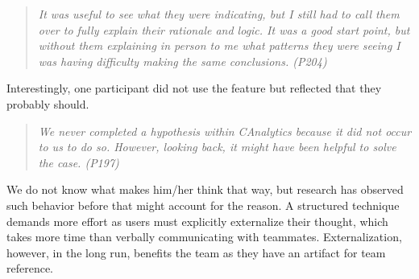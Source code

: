\begin{quote}
\emph{It was useful to see what they were indicating, but I still had to call them over to fully explain their rationale and logic. It was a good start point, but without them explaining in person to me what patterns they were seeing I was having difficulty making the same conclusions. (P204)}

\end{quote}

Interestingly, one participant did not use the feature but reflected that they probably should. 

\begin{quote}
\emph{We never completed a hypothesis within CAnalytics because it did not occur to us to do so. However, looking back, it might have been helpful to solve the case. (P197)}
\end{quote}

We do not know what makes him/her think that way, but research has observed such behavior before that might account for the reason. A structured technique demands more effort as users must explicitly externalize their thought, which takes more time than verbally communicating with teammates. Externalization, however, in the long run, benefits the team as they have an artifact for team reference. 



